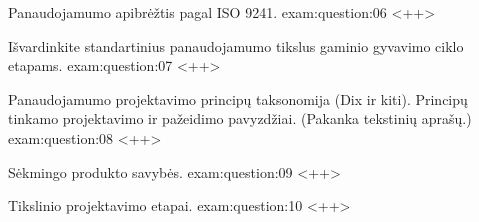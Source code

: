 \begin{question}{%
  Panaudojamumo apibrėžtis pagal ISO 9241.
  }{exam:question:06}
  <++>
\end{question}

\begin{question}{%
  Išvardinkite standartinius panaudojamumo tikslus gaminio gyvavimo ciklo
  etapams.
  }{exam:question:07}
  <++>
\end{question}

\begin{question}{%
  Panaudojamumo projektavimo principų taksonomija (Dix ir kiti).
  Principų tinkamo projektavimo ir pažeidimo pavyzdžiai. (Pakanka
  tekstinių aprašų.)
  }{exam:question:08}
  <++>
\end{question}

\begin{question}{%
  Sėkmingo produkto savybės.
  }{exam:question:09}
  <++>
\end{question}

\begin{question}{%
  Tikslinio projektavimo etapai.
  }{exam:question:10}
  <++>
\end{question}
